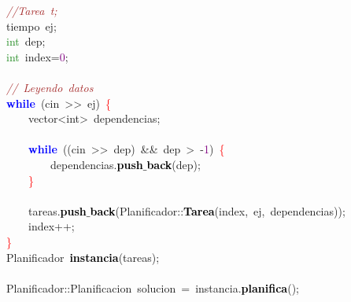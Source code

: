 \mbox{}\ \ \ \ \textit{\textcolor{Brown}{//Tarea\ t;}} \\
\mbox{}\ \ \ \ \textcolor{TealBlue}{tiempo}\ ej\textcolor{BrickRed}{;} \\
\mbox{}\ \ \ \ \textcolor{ForestGreen}{int}\ dep\textcolor{BrickRed}{;} \\
\mbox{}\ \ \ \ \textcolor{ForestGreen}{int}\ index\textcolor{BrickRed}{=}\textcolor{Purple}{0}\textcolor{BrickRed}{;} \\
\mbox{} \\
\mbox{}\ \ \ \ \textit{\textcolor{Brown}{//\ Leyendo\ datos}} \\
\mbox{}\ \ \ \ \textbf{\textcolor{Blue}{while}}\ \textcolor{BrickRed}{(}cin\ \textcolor{BrickRed}{\textgreater{}\textgreater{}}\ ej\textcolor{BrickRed}{)}\ \textcolor{Red}{\{} \\
\mbox{}\ \ \ \ \ \ \ \ \textcolor{TealBlue}{vector\textless{}int\textgreater{}}\ dependencias\textcolor{BrickRed}{;} \\
\mbox{} \\
\mbox{}\ \ \ \ \ \ \ \ \textbf{\textcolor{Blue}{while}}\ \textcolor{BrickRed}{((}cin\ \textcolor{BrickRed}{\textgreater{}\textgreater{}}\ dep\textcolor{BrickRed}{)}\ \textcolor{BrickRed}{\&\&}\ dep\ \textcolor{BrickRed}{\textgreater{}}\ \textcolor{BrickRed}{-}\textcolor{Purple}{1}\textcolor{BrickRed}{)}\ \textcolor{Red}{\{} \\
\mbox{}\ \ \ \ \ \ \ \ \ \ \ \ dependencias\textcolor{BrickRed}{.}\textbf{\textcolor{Black}{push$\_$back}}\textcolor{BrickRed}{(}dep\textcolor{BrickRed}{);} \\
\mbox{}\ \ \ \ \ \ \ \ \textcolor{Red}{\}} \\
\mbox{} \\
\mbox{}\ \ \ \ \ \ \ \ tareas\textcolor{BrickRed}{.}\textbf{\textcolor{Black}{push$\_$back}}\textcolor{BrickRed}{(}Planificador\textcolor{BrickRed}{::}\textbf{\textcolor{Black}{Tarea}}\textcolor{BrickRed}{(}index\textcolor{BrickRed}{,}\ ej\textcolor{BrickRed}{,}\ dependencias\textcolor{BrickRed}{));} \\
\mbox{}\ \ \ \ \ \ \ \ index\textcolor{BrickRed}{++;} \\
\mbox{}\ \ \ \ \textcolor{Red}{\}} \\
\mbox{}\ \ \ \ \textcolor{TealBlue}{Planificador}\ \textbf{\textcolor{Black}{instancia}}\textcolor{BrickRed}{(}tareas\textcolor{BrickRed}{);} \\
\mbox{} \\
\mbox{}\ \ \ \ Planificador\textcolor{BrickRed}{::}\textcolor{TealBlue}{Planificacion}\ solucion\ \textcolor{BrickRed}{=}\ instancia\textcolor{BrickRed}{.}\textbf{\textcolor{Black}{planifica}}\textcolor{BrickRed}{();} \\
